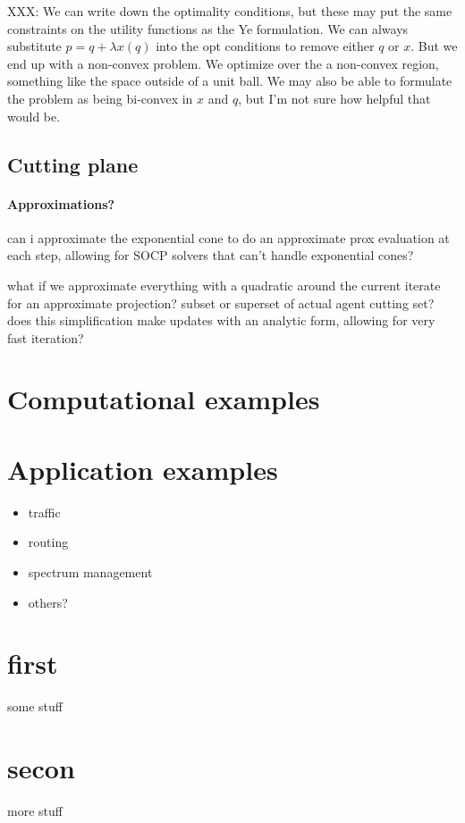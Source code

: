 \documentclass[12pt]{article}
\begin{document}
XXX: We can write down the optimality conditions, but these may put the same
constraints on the utility functions as the Ye formulation. We can always
substitute $p = q + \lambda x(q)$ into the opt conditions to remove either
$q$ or $x$. But we end up with a non-convex problem. We optimize over the a
non-convex region, something like the space outside of a unit ball.
We may also be able to formulate the problem as being bi-convex in $x$ and $q$,
but I'm not sure how helpful that would be.

\subsection{Cutting plane}
\paragraph{Approximations?}
can i approximate the exponential cone to do an approximate prox evaluation
at each step, allowing for SOCP solvers that can't handle exponential cones?

what if we approximate everything with a quadratic around the current iterate
for an approximate projection? subset or superset of actual agent cutting set?
does this simplification make updates with an analytic form, allowing for very
fast iteration?


\section{Computational examples}

\section{Application examples}
\cite{shoven1992applying}

\begin{itemize}
\item traffic
\item routing
\item spectrum management
\item others?
\end{itemize}

\appendix
\section{first}
some stuff
\section{secon}
more stuff


\newpage


\end{document}
